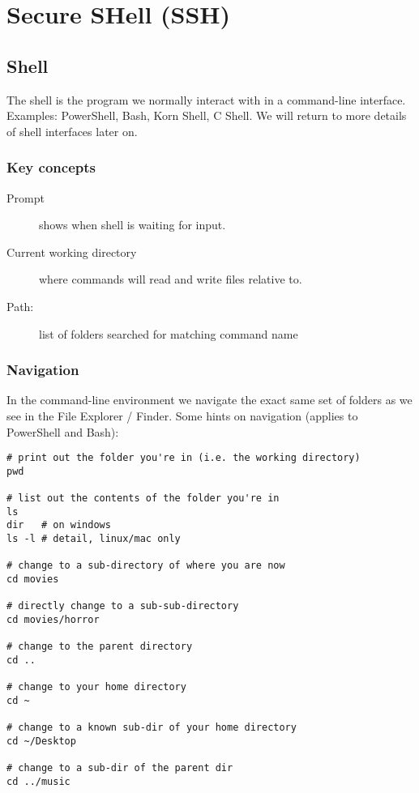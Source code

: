 \chapter{Secure SHell (SSH)}
\label{ch:ssh}

\section{Shell}

The shell is the program we normally interact with in a command-line interface.
Examples: PowerShell, Bash, Korn Shell, C Shell.
We will return to more details of shell interfaces later on. 

\subsection{Key concepts}

\begin{description}
\item[Prompt] shows when shell is waiting for input.
\item[Current working directory] where commands will read and write files relative to.
\item[Path:] list of folders searched for matching command name
\end{description}

\subsection{Navigation}

In the command-line environment we navigate the exact same set of folders as we see in the File Explorer / Finder.
Some hints on navigation (applies to PowerShell and Bash):

\begin{verbatim}
# print out the folder you're in (i.e. the working directory)
pwd

# list out the contents of the folder you're in
ls
dir   # on windows
ls -l # detail, linux/mac only

# change to a sub-directory of where you are now
cd movies

# directly change to a sub-sub-directory
cd movies/horror

# change to the parent directory
cd ..

# change to your home directory
cd ~

# change to a known sub-dir of your home directory
cd ~/Desktop

# change to a sub-dir of the parent dir
cd ../music
\end{verbatim}

